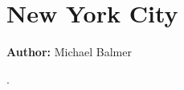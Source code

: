 \section{New York City}
\label{ch:scenarios:nyc}
\hfill \textbf{Author:} Michael Balmer


\citep[][]{Balmer_unpub_ZMNY_2014}. 

